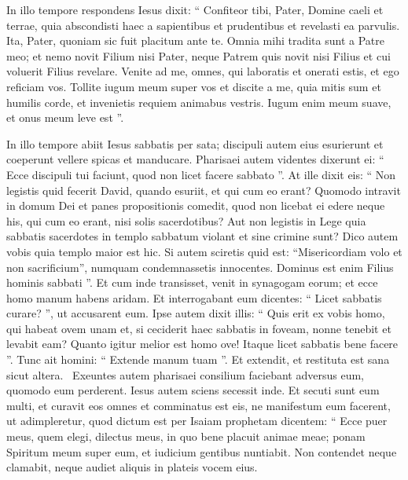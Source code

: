 \begin{biblechapter}
\begin{biblechapter}
\begin{biblechapter}
\begin{biblechapter}
\begin{biblechapter}
\begin{biblechapter}
\begin{biblechapter}
\begin{biblechapter}
\begin{biblechapter}
\begin{biblechapter}
\begin{biblechapter}
 \verse In illo tempore respondens Iesus dixit: “ Confiteor tibi, Pater, Domine caeli et terrae, quia abscondisti haec a sapientibus et prudentibus et revelasti ea parvulis. 
\verse Ita, Pater, quoniam sic fuit placitum ante te. 
\verse Omnia mihi tradita sunt a Patre meo; et nemo novit Filium nisi Pater, neque Patrem quis novit nisi Filius et cui voluerit Filius revelare.
 \verse Venite ad me, omnes, qui laboratis et onerati estis, et ego reficiam vos. 
 \verse Tollite iugum meum super vos et discite a me, quia mitis sum et humilis corde, et invenietis requiem animabus vestris. 
\verse Iugum enim meum suave, et onus meum leve est ”.
 
\begin{biblechapter}
\verse In illo tempore abiit Iesus sabbatis per sata; discipuli autem eius esurierunt et coeperunt vellere spicas et manducare. 
\verse Pharisaei autem videntes dixerunt ei: “ Ecce discipuli tui faciunt, quod non licet facere sabbato ”. 
\verse At ille dixit eis: “ Non legistis quid fecerit David, quando esuriit, et qui cum eo erant? 
\verse Quomodo intravit in domum Dei et panes propositionis comedit, quod non licebat ei edere neque his, qui cum eo erant, nisi solis sacerdotibus? 
\verse Aut non legistis in Lege quia sabbatis sacerdotes in templo sabbatum violant et sine crimine sunt? 
\verse Dico autem vobis quia templo maior est hic. 
 \verse Si autem sciretis quid est: “Misericordiam volo et non sacrificium”, numquam condemnassetis innocentes. 
\verse Dominus est enim Filius hominis sabbati ”.
 \verse Et cum inde transisset, venit in synagogam eorum; 
\verse et ecce homo manum habens aridam. Et interrogabant eum dicentes: “ Licet sabbatis curare? ”, ut accusarent eum. 
\verse Ipse autem dixit illis: “ Quis erit ex vobis homo, qui habeat ovem unam et, si ceciderit haec sabbatis in foveam, nonne tenebit et levabit eam? 
\verse Quanto igitur melior est homo ove! Itaque licet sabbatis bene facere ”. 
\verse Tunc ait homini: “ Extende manum tuam ”. Et extendit, et restituta est sana sicut altera. 
 \verse Exeuntes autem pharisaei consilium faciebant adversus eum, quomodo eum perderent.
 \verse Iesus autem sciens secessit inde. Et secuti sunt eum multi, et curavit eos omnes 
\verse et comminatus est eis, ne manifestum eum facerent, 
\verse ut adimpleretur, quod dictum est per Isaiam prophetam dicentem:
 \verse “ Ecce puer meus, quem elegi,
 dilectus meus, in quo bene placuit animae meae;
 ponam Spiritum meum super eum,
 et iudicium gentibus nuntiabit.
 \verse Non contendet neque clamabit,
 neque audiet aliquis in plateis vocem eius.

\end{biblechapter}
\end{biblechapter}
\end{biblechapter}
\end{biblechapter}
\end{biblechapter}
\end{biblechapter}
\end{biblechapter}
\end{biblechapter}
\end{biblechapter}
\end{biblechapter}
\end{biblechapter}
\end{biblechapter}
